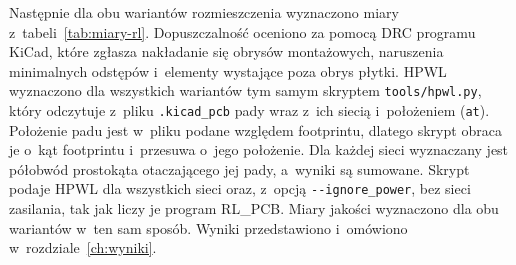 Następnie dla obu wariantów rozmieszczenia wyznaczono miary
z~tabeli~\ref{tab:miary-rl}. Dopuszczalność oceniono za pomocą DRC
programu KiCad, które zgłasza nakładanie się obrysów montażowych,
naruszenia minimalnych odstępów i~elementy wystające poza obrys płytki.
HPWL wyznaczono dla wszystkich wariantów tym samym skryptem
\texttt{tools/hpwl.py}, który odczytuje z~pliku \texttt{.kicad\_pcb}
pady wraz z~ich siecią i~położeniem (\texttt{at}). Położenie padu jest
w~pliku podane względem footprintu, dlatego skrypt obraca je o~kąt
footprintu i~przesuwa o~jego położenie. Dla każdej sieci wyznaczany jest
półobwód prostokąta otaczającego jej pady, a~wyniki są sumowane. Skrypt
podaje HPWL dla wszystkich sieci oraz, z~opcją
\texttt{-{}-ignore\_power}, bez sieci zasilania, tak jak liczy je
program RL\_PCB.
Miary jakości wyznaczono dla obu wariantów w~ten sam sposób. Wyniki przedstawiono
i~omówiono w~rozdziale~\ref{ch:wyniki}.
